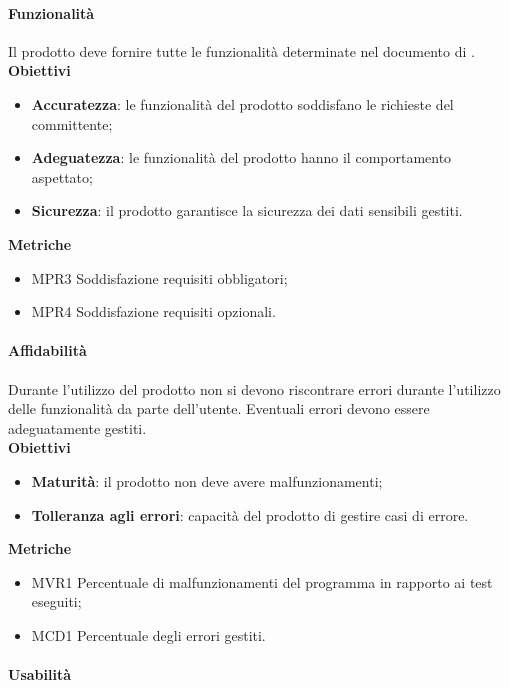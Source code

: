 \paragraph{Funzionalità}

Il prodotto deve fornire tutte le funzionalità determinate nel documento di \AdR{}. \\

\textbf{Obiettivi}
\begin{itemize}
\item \textbf{Accuratezza}: le funzionalità del prodotto soddisfano le richieste del committente;
\item \textbf{Adeguatezza}: le funzionalità del prodotto hanno il comportamento aspettato;
\item \textbf{Sicurezza}: il prodotto garantisce la sicurezza dei dati sensibili gestiti.
\end{itemize}

\textbf{Metriche}
\begin{itemize}
\item MPR3 Soddisfazione requisiti obbligatori;
\item MPR4 Soddisfazione requisiti opzionali.
\end{itemize}

\paragraph{Affidabilità}

Durante l'utilizzo del prodotto non si devono riscontrare errori durante l'utilizzo delle funzionalità da parte dell'utente. Eventuali errori devono essere adeguatamente gestiti. \\

\textbf{Obiettivi}
\begin{itemize}
\item \textbf{Maturità}: il prodotto non deve avere malfunzionamenti;
\item \textbf{Tolleranza agli errori}: capacità del prodotto di gestire casi di errore.
\end{itemize}

\textbf{Metriche}
\begin{itemize}
\item MVR1 Percentuale di malfunzionamenti del programma in rapporto ai test eseguiti;
\item MCD1 Percentuale degli errori gestiti.
\end{itemize}

\paragraph{Usabilità}

